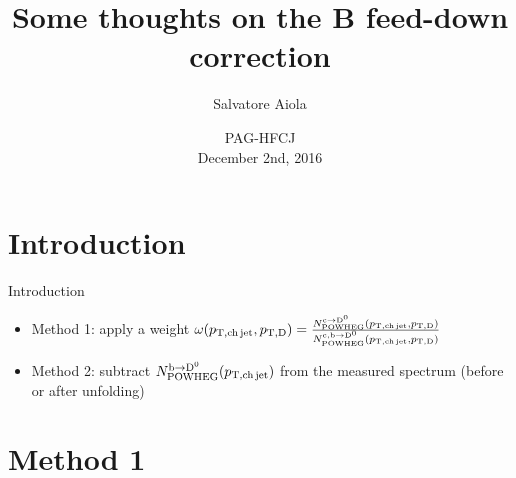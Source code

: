\documentclass[xcolor={usenames,dvipsnames}]{beamer}
\title[B feed-down correction] %
{Some thoughts on the B feed-down correction}
\author[Salvatore Aiola]%
{Salvatore Aiola}
\institute[Yale University] %
{Yale University}
\date[PAG-HFCJ - Dec. 2nd, 2016] %
{PAG-HFCJ \\
December 2nd, 2016}
\begin{document}
\begin{frame}
  \titlepage
\end{frame}






\section{Introduction}

\begin{frame}{Introduction}
\begin{itemize}
\item Method 1: apply a weight $\omega(p_{\mathrm{T,ch\, jet}},p_{\mathrm{T,D}})=\frac{N^{\rm c\rightarrow\mathrm{D^{0}}}_{\rm POWHEG}(p_{\mathrm{T,ch\, jet}},p_{\mathrm{T,D}})}{N^{\rm c,b\rightarrow\mathrm{D^{0}}}_{\rm POWHEG}(p_{\mathrm{T,ch\, jet}},p_{\mathrm{T,D}})}$
\item Method 2: subtract $N^{\rm b\rightarrow\mathrm{D^{0}}}_{\rm POWHEG}(p_{\mathrm{T,ch\, jet}})$ from the measured spectrum (before or after unfolding)
\end{itemize}
\end{frame}

\section{Method 1}
\end{document}
